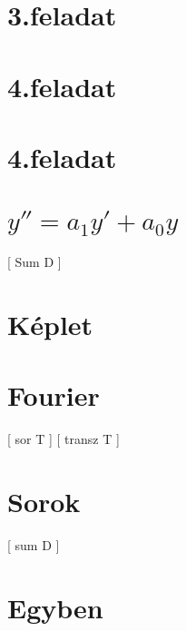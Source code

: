 \begin{spacing}{1.4}
\section*{3.feladat} \label{DBodeber3Mo}
\Mo{

}
\vspace{0.5cm}
\newpage
\section*{4.feladat} \label{DBodeber4}
\Fa{

}
\vspace{0.5cm}
\newpage
\section*{4.feladat} \label{DBodeber4Mo}
\Mo{

}
\vspace{0.5cm}
\newpage
\section*{$y''= a_1 y' + a_0 y$} \label{DBodemaholke}
 [ Sum D ]
\vspace{0.5cm}
\newpage
\section*{Képlet} \label{DBodemaholkeSum}
\Desc{

}
\vspace{0.5cm}
\newpage
\section*{Fourier} \label{DBfourier}
 [ sor T ]
\newline
{}
 [ transz T ]
\vspace{0.5cm}
\newpage
\section*{Sorok} \label{DBfouriersor}
 [ sum D ]
\vspace{0.5cm}
\newpage
\section*{Egyben} \label{DBfouriersorsum}
\Desc{

}
\vspace{0.5cm}
\newpage

\end{spacing}

